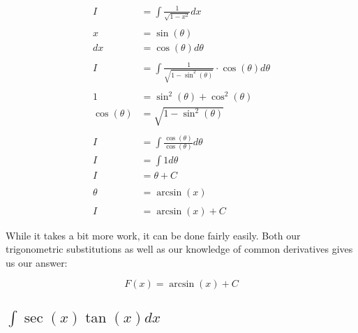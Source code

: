 \documentclass[12pt]{article}
\begin{document}
\begin{align}
    I            & = \int \frac{1}{\sqrt{1-x^2}} dx                                    \\
    \nonumber                                                                          \\
    x            & = \sin(\theta)                                                      \\
    dx           & = \cos(\theta) d\theta                                              \\
    \nonumber                                                                          \\
    I            & = \int \frac{1}{\sqrt{1-\sin^2(\theta)}} \cdot \cos(\theta) d\theta \\
    \nonumber                                                                          \\
    1            & = \sin^2(\theta) + \cos^2(\theta)                                   \\
    \cos(\theta) & = \sqrt{1 - \sin^2(\theta)}                                         \\
    \nonumber                                                                          \\
    I            & = \int \frac{\cos(\theta)}{\cos(\theta)} d\theta                    \\
    I            & = \int 1 d\theta                                                    \\
    I            & = \theta + C                                                        \\
    \nonumber                                                                          \\
    \theta       & = \arcsin(x)                                                        \\
    \nonumber                                                                          \\
    I            & = \arcsin(x) + C
\end{align}

While it takes a bit more work, it can be done fairly easily. Both our trigonometric substitutions as well as our knowledge of common derivatives gives us our answer:

$$
    F(x) = \arcsin(x) + C
$$

\subsection{$\int \sec(x) \tan(x) dx$}
\end{document}
